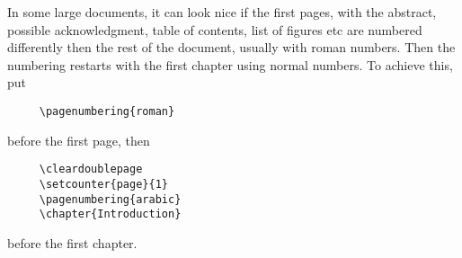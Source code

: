 In some large documents, it can look nice if the first pages, with
the abstract, possible acknowledgment, table of contents, list of
figures etc are numbered differently then the rest of the document,
usually with roman numbers. Then the numbering restarts with the
first chapter using normal numbers. To achieve this, put 
\begin{verbatim}
     \pagenumbering{roman}
\end{verbatim}
before the first page, then
\begin{verbatim}
     \cleardoublepage
     \setcounter{page}{1}
     \pagenumbering{arabic}
     \chapter{Introduction}
\end{verbatim}
before the first chapter.
